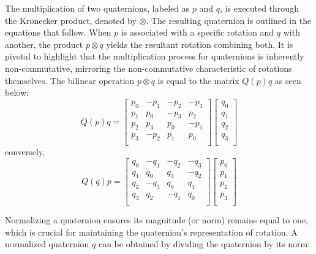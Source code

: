 \documentclass{article}
\begin{document}
The multiplication of two quaternions, labeled as \( p \) and \( q \), is executed through the Kronecker product, denoted by \( \otimes \). The resulting quaternion is outlined in the equations that follow. When \( p \) is associated with a specific rotation and \( q \) with another, the product \( p \otimes q \) yields the resultant rotation combining both. It is pivotal to highlight that the multiplication process for 
quaternions is inherently non-commutative, mirroring the non-commutative characteristic of rotations themselves. The bilinear operation \( p \otimes q \) is equal to the matrix \(Q(p)q\) as seen below:
\begin{equation}
  Q(p)q = 
  \begin{bmatrix}
    p_0 & -p_1 & -p_2 & -p_3 \\
    p_1 & p_0 & -p_3 & p_2 \\
    p_2 & p_3 & p_0 & -p_1 \\
    p_3 & -p_2 & p_1 & p_0 \\
\end{bmatrix}
\begin{bmatrix}
    q_0 \\
    q_1 \\
    q_2 \\
    q_3 \\
\end{bmatrix}
\end{equation}
conversely, 
\begin{equation}
  Q(q)p = 
  \begin{bmatrix}
    q_0 & -q_1 & -q_2 & -q_3 \\
    q_1 & q_0 & q_3 & -q_2 \\
    q_2 & -q_3 & q_0 & q_1 \\
    q_3 & q_2 & -q_1 & q_0 \\
\end{bmatrix}
\begin{bmatrix}
    p_0 \\
    p_1 \\
    p_2 \\
    p_3 \\
\end{bmatrix}
\end{equation}

Normalizing a quaternion ensures its magnitude (or norm) remains equal to one, which is crucial for maintaining the quaternion's representation of rotation. A normalized quaternion \( q \) can be obtained by dividing the quaternion by its norm:
\end{document}
